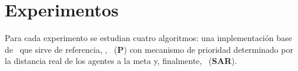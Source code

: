 \section{Experimentos}
\label{sec:experiments}





Para cada experimento se estudian cuatro algoritmos:
una implementaci\'on base de \astar\ que sirve de referencia,
\ambush, \pambush\ (\textbf{P}) con mecanismo de prioridad determinado por
la distancia real de los agentes a la meta y, finalmente, \sarambush\
(\textbf{SAR}).

